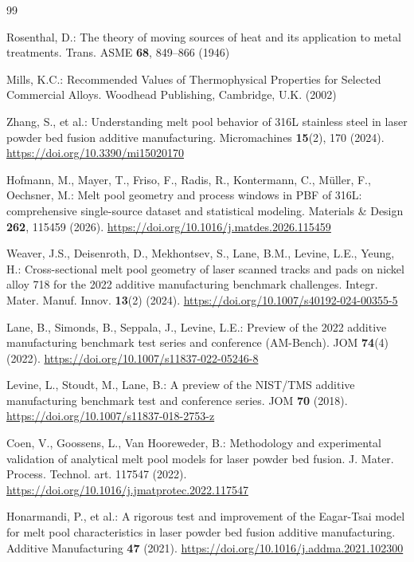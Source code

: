 \documentclass[12pt]{article}
\begin{document}
\begin{thebibliography}{99}

Rosenthal, D.: The theory of moving sources of heat and its application to metal treatments. Trans. ASME \textbf{68}, 849--866 (1946)

Mills, K.C.: Recommended Values of Thermophysical Properties for Selected Commercial Alloys. Woodhead Publishing, Cambridge, U.K. (2002)

Zhang, S., et al.: Understanding melt pool behavior of 316L stainless steel in laser powder bed fusion additive manufacturing. Micromachines \textbf{15}(2), 170 (2024). \url{https://doi.org/10.3390/mi15020170}

Hofmann, M., Mayer, T., Friso, F., Radis, R., Kontermann, C., M\"uller, F., Oechsner, M.: Melt pool geometry and process windows in PBF of 316L: comprehensive single-source dataset and statistical modeling. Materials \& Design \textbf{262}, 115459 (2026). \url{https://doi.org/10.1016/j.matdes.2026.115459}

Weaver, J.S., Deisenroth, D., Mekhontsev, S., Lane, B.M., Levine, L.E., Yeung, H.: Cross-sectional melt pool geometry of laser scanned tracks and pads on nickel alloy 718 for the 2022 additive manufacturing benchmark challenges. Integr. Mater. Manuf. Innov. \textbf{13}(2) (2024). \url{https://doi.org/10.1007/s40192-024-00355-5}

Lane, B., Simonds, B., Seppala, J., Levine, L.E.: Preview of the 2022 additive manufacturing benchmark test series and conference (AM-Bench). JOM \textbf{74}(4) (2022). \url{https://doi.org/10.1007/s11837-022-05246-8}

Levine, L., Stoudt, M., Lane, B.: A preview of the NIST/TMS additive manufacturing benchmark test and conference series. JOM \textbf{70} (2018). \url{https://doi.org/10.1007/s11837-018-2753-z}

Coen, V., Goossens, L., Van Hooreweder, B.: Methodology and experimental validation of analytical melt pool models for laser powder bed fusion. J. Mater. Process. Technol. art. 117547 (2022). \url{https://doi.org/10.1016/j.jmatprotec.2022.117547}

Honarmandi, P., et al.: A rigorous test and improvement of the Eagar-Tsai model for melt pool characteristics in laser powder bed fusion additive manufacturing. Additive Manufacturing \textbf{47} (2021). \url{https://doi.org/10.1016/j.addma.2021.102300}


\end{thebibliography}
\end{document}
